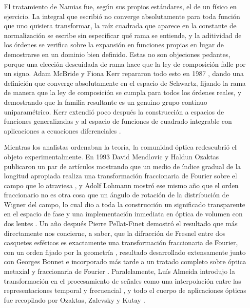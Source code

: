 		El tratamiento de Namias fue, según sus propios estándares, el de un físico en ejercicio. La integral que escribió no converge absolutamente para toda función que uno quisiera transformar, la raíz cuadrada que aparece en la constante de normalización se escribe sin especificar qué rama se entiende, y la aditividad de los órdenes se verifica sobre la expansión en funciones propias en lugar de demostrarse en un dominio bien definido. Estas no son objeciones pedantes, porque una elección descuidada de rama hace que la ley de composición falle por un signo. Adam McBride y Fiona Kerr repararon todo esto en 1987 \citep{mcbride1987namias}, dando una definición que converge absolutamente en el espacio de Schwartz, fijando la rama de manera que la ley de composición se cumpla para todos los órdenes reales, y demostrando que la familia resultante es un genuino grupo continuo uniparamétrico. Kerr extendió poco después la construcción a espacios de funciones generalizadas \citep{kerr1988distributional} y al espacio de funciones de cuadrado integrable con aplicaciones a ecuaciones diferenciales \citep{kerr1988namias}.

		Mientras los analistas ordenaban la teoría, la comunidad óptica redescubrió el objeto experimentalmente. En 1993 David Mendlovic y Haldun Ozaktas publicaron un par de artículos mostrando que un medio de índice gradual de la longitud apropiada realiza una transformación fraccionaria de Fourier sobre el campo que lo atraviesa \citep{mendlovic1993fractional, ozaktas1993fractional}, y Adolf Lohmann mostró ese mismo año que el orden fraccionario no es otra cosa que un ángulo de rotación de la distribución de Wigner del campo, lo cual dio a toda la construcción un significado transparente en el espacio de fase y una implementación inmediata en óptica de volumen con dos lentes \citep{lohmann1993image}. Un año después Pierre Pellat-Finet demostró el resultado que más directamente nos concierne, a saber, que la difracción de Fresnel entre dos casquetes esféricos es exactamente una transformación fraccionaria de Fourier, con un orden fijado por la geometría \citep{pellatfinet1994fresnel}, resultado desarrollado extensamente junto con Georges Bonnet \citep{pellatfinet1994fractional} e incorporado más tarde a un tratado completo sobre óptica metaxial y fraccionaria de Fourier \citep{pellatfinet2009optique}. Paralelamente, Luís Almeida introdujo la transformación en el procesamiento de señales como una interpolación entre las representaciones temporal y frecuencial \citep{almeida1994fractional}, y todo el cuerpo de aplicaciones ópticas fue recopilado por Ozaktas, Zalevsky y Kutay \citeyearpar{ozaktas2001fractional}.

